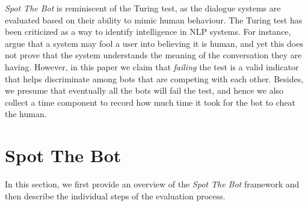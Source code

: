 \documentclass[11pt,a4paper]{article}
\begin{document}
 \emph{Spot The Bot} is reminiscent of the Turing test, as the dialogue systems are evaluated based on their ability to mimic human behaviour. The Turing test has been criticized as a way to identify intelligence in NLP systems. For instance, \citet{bender-2020-acl} argue that a system may fool a user into believing it is human, and yet this does not prove that the system understands the meaning of the conversation they are having. However, in this paper we claim that \emph{failing} the test is a valid indicator that helps discriminate among bots that are competing with each other. Besides, we presume that eventually all the bots will fail the test, and hence we also collect a time component to record how much time it took for the bot to cheat the human.




\section{Spot The Bot}

In this section, we first provide an overview of the \emph{Spot The Bot} framework and then describe the individual steps of the evaluation process.

\end{document}
